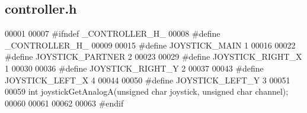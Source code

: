 \subsection{controller.\+h}
\label{controller_8h_source}

\begin{DoxyCode}
00001 
00007 \textcolor{preprocessor}{#ifndef \_CONTROLLER\_H\_}
00008 \textcolor{preprocessor}{#define \_CONTROLLER\_H\_}
00009 
00015 \textcolor{preprocessor}{#define JOYSTICK\_MAIN 1}
00016 
00022 \textcolor{preprocessor}{#define JOYSTICK\_PARTNER 2}
00023 
00029 \textcolor{preprocessor}{#define JOYSTICK\_RIGHT\_X 1}
00030 
00036 \textcolor{preprocessor}{#define JOYSTICK\_RIGHT\_Y 2}
00037 
00043 \textcolor{preprocessor}{#define JOYSTICK\_LEFT\_X 4}
00044 
00050 \textcolor{preprocessor}{#define JOYSTICK\_LEFT\_Y 3}
00051 
00059 \textcolor{keywordtype}{int} joystickGetAnalogA(\textcolor{keywordtype}{unsigned} \textcolor{keywordtype}{char} joystick, \textcolor{keywordtype}{unsigned} \textcolor{keywordtype}{char} channel);
00060 
00061 
00062 
00063 \textcolor{preprocessor}{#endif}
\end{DoxyCode}
